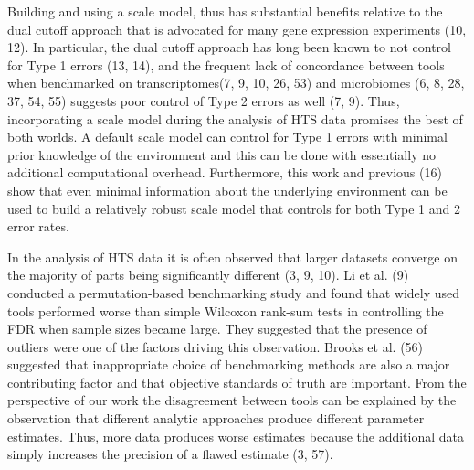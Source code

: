 \documentclass[
]{article}
\begin{document}
Building and using a scale model, thus has substantial benefits relative
to the dual cutoff approach that is advocated for many gene expression
experiments (10, 12). In particular, the dual cutoff approach has long
been known to not control for Type 1 errors (13, 14), and the frequent
lack of concordance between tools when benchmarked on transcriptomes(7,
9, 10, 26, 53) and microbiomes (6, 8, 28, 37, 54, 55) suggests poor
control of Type 2 errors as well (7, 9). Thus, incorporating a scale
model during the analysis of HTS data promises the best of both worlds.
A default scale model can control for Type 1 errors with minimal prior
knowledge of the environment and this can be done with essentially no
additional computational overhead. Furthermore, this work and previous
(16) show that even minimal information about the underlying environment
can be used to build a relatively robust scale model that controls for
both Type 1 and 2 error rates.

In the analysis of HTS data it is often observed that larger datasets
converge on the majority of parts being significantly different (3, 9,
10). Li et al. (9) conducted a permutation-based benchmarking study and
found that widely used tools performed worse than simple Wilcoxon
rank-sum tests in controlling the FDR when sample sizes became large.
They suggested that the presence of outliers were one of the factors
driving this observation. Brooks et al. (56) suggested that
inappropriate choice of benchmarking methods are also a major
contributing factor and that objective standards of truth are important.
From the perspective of our work the disagreement between tools can be
explained by the observation that different analytic approaches produce
different parameter estimates. Thus, more data produces worse estimates
because the additional data simply increases the precision of a flawed
estimate (3, 57).
\end{document}
